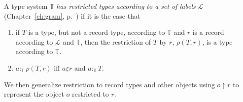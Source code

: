  

A type system $\mathbb{T}$ \textit{has restricted types according to a
  set of labels} $\mathcal{L}$ (Chapter~\ref{ch:gram},
p.~\pageref{pg:typerestriction}) if it is the case that
\begin{enumerate} 
 
\item   if  $T$ is a type, but not a record type, according to $\mathbb{T}$ and
  $r$ is a record according to $\mathcal{L}$ and $\mathbb{T}$, then the
  restriction of $T$ by $r$, $\rho(T, r)$, is a
  type according to $\mathbb{T}$.
  
 
\item $a:_{\mathbb{T}}\rho(T,r)$ iff $a\underline{\varepsilon} r$  and
  $a:_{\mathbb{T}}T$.

\end{enumerate}





We then generalize restriction to record types and other objects using
$o\!\restriction\!r$ to represent the object $o$ restricted to $r$.


